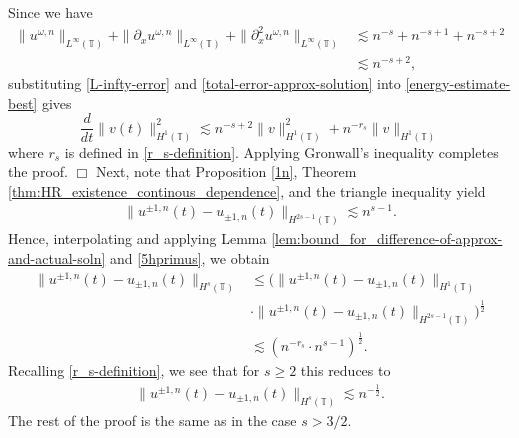 \documentclass[12pt,reqno]{amsart}
\newcommand{\p}{\partial}
\newcommand{\ci}{\mathbb{T}}
\theoremstyle{plain}  %
\theoremstyle{definition}
\begin{document}
Since we have
\begin{equation}
	\label{L-infty-error}
	\begin{split}
		\|u^{\omega,n} \|_{L^\infty(\ci)} + \|\p_x u^{\omega,n} \|_{L^\infty(\ci)}
		+ \|\p_x^2 u^{\omega,n} \|_{L^\infty(\ci)}
		& \lesssim 
		n^{-s} + n^{-s+1} + n^{-s + 2} \\
		& \lesssim n^{-s + 2}  ,
	\end{split}
\end{equation}
substituting \eqref{L-infty-error} and \eqref{total-error-approx-solution} into
\eqref{energy-estimate-best} gives
\begin{equation}
	\label{en-est-fin!}
	\frac{d}{dt} \|v(t)\|_{H^1(\ci)}^2 \lesssim n^{-s+2} \|v\|_{H^1(\ci)}^2 + n^{-r_s}
	\|v \|_{H^1(\ci)}
\end{equation}
where $r_s$ is defined in \eqref{r_s-definition}.
Applying Gronwall's inequality completes the proof. $\Box$
%
\vskip0.1in
Next, note that Proposition \ref{1n}, Theorem
\ref{thm:HR_existence_continous_dependence}, and the triangle inequality
yield
\begin{equation}
	\begin{split}
		\|u^{\pm 1, n} (t) - u_{\pm 1, n}(t)\|_{H^{2s - 1}(\ci)}
		\lesssim n^{s-1}.
		\label{5hprimus}
	\end{split}
\end{equation}
Hence, interpolating and applying Lemma
\ref{lem:bound_for_difference-of-approx-and-actual-soln} and
\eqref{5hprimus}, we obtain
			\begin{equation*}
				\begin{split}
					\|u^{\pm 1,n}(t) - u_{\pm 1, n}(t) \|_{H^s (\ci)}
					& \le ( \| u^{\pm 1,n}(t)
					- u_{\pm 1, n}(t) \|_{H^1 (\ci)}
					\\
					& \cdot \| u^{\pm 1,n}(t)
					- u_{\pm 1, n}(t)\|_{H^{2s-1}(\ci)} )^{\frac{1}{2}}
					\\
					& \lesssim (n^{-r_s} \cdot n^{s-1})^{\frac{1}{2}}.
				\end{split}
			\end{equation*}
			Recalling \eqref{r_s-definition}, we see that for $s \ge 2$ this reduces to
			\begin{equation}
				\begin{split}
					\|u^{\pm 1,n}(t) - u_{\pm 1, n}(t) \|_{H^s (\ci)} \lesssim
					n^{-\frac{1}{2}}.
					\label{10v}
				\end{split}
			\end{equation}
%
The rest of the proof is the same as in the case $s>3/2$.
\end{document}
